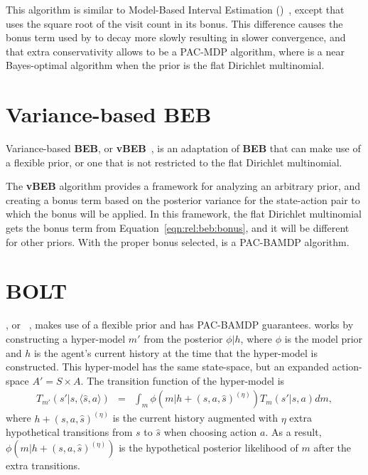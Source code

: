 This algorithm is similar to Model-Based Interval Estimation ()~\cite{strehl06}, except that  uses the square root of the visit count in its bonus. This difference causes the bonus term used by  to decay more slowly resulting in slower convergence, and that extra conservativity allows  to be a PAC-MDP algorithm, where  is a near Bayes-optimal algorithm when the prior is the flat Dirichlet multinomial.

\section{Variance-based BEB}

Variance-based {\bf BEB}, or {\bf vBEB}~\cite{sorg10}, is an adaptation of {\bf BEB} that can make use of a flexible prior, or one that is not restricted to the flat Dirichlet multinomial.

The {\bf vBEB} algorithm provides a framework for analyzing an arbitrary prior, and creating a bonus term based on the posterior variance for the state-action pair to which the bonus will be applied. In this framework, the flat Dirichlet multinomial gets the bonus term from Equation~\ref{eqn:rel:beb:bonus}, and it will be different for other priors. With the proper bonus selected,  is a PAC-BAMDP algorithm.

\section{BOLT}

, or ~\cite{araya2012near}, makes use of a flexible prior and has PAC-BAMDP guarantees.  works by constructing a hyper-model $m'$ from the posterior $\phi|h$, where $\phi$ is the model prior and $h$ is the agent's current history at the time that the hyper-model is constructed. This hyper-model has the same state-space, but an expanded action-space $A' = S \times A$. The transition function of the hyper-model is
\begin{eqnarray}
T_{m'}(s'|s, \langle \hat s, a \rangle) &=& \int_m \phi(m|h+(s,a,\hat s)^{(\eta)})T_m(s'|s,a) d m,
\end{eqnarray}
where $h+(s,a,\hat s)^{(\eta)}$ is the current history augmented with $\eta$ extra hypothetical transitions from $s$ to $\hat s$ when choosing action $a$. As a result, $\phi(m|h+(s,a,\hat s)^{(\eta)})$ is the hypothetical posterior likelihood of $m$ after the extra transitions.

